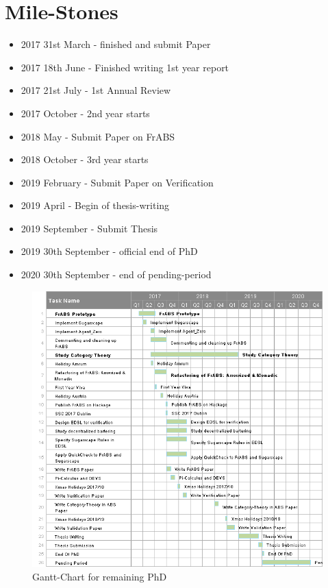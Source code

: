 \section{Mile-Stones}
\begin{itemize}
	\item 2017 31st March - finished and submit Paper 
	\item 2017 18th June - Finished writing 1st year report 
	\item 2017 21st July - 1st Annual Review
	\item 2017 October - 2nd year starts
	\item 2018 May - Submit Paper on FrABS
	\item 2018 October - 3rd year starts
	\item 2019 February - Submit Paper on Verification
	\item 2019 April - Begin of thesis-writing
	\item 2019 September - Submit Thesis
	\item 2019 30th September - official end of PhD
	\item 2020 30th September - end of pending-period
\end{itemize}

\label{app:gantt}
\begin{landscape}
	\begin{figure}
		\label{fig:gantt}
  		\caption{Gantt-Chart for remaining PhD}
  		\centering
  		\includegraphics[width=1.2\textwidth]{./charts/gantt.png}
	\end{figure}
\end{landscape}
